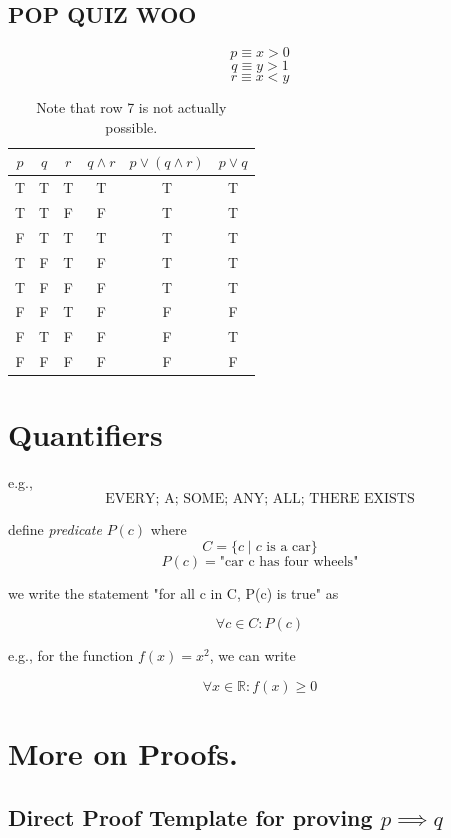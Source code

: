 \documentclass{article}
\begin{document}
\subsection*{POP QUIZ WOO}

$$p \equiv x > 0$$
$$q \equiv y > 1$$
$$r \equiv x < y$$


\begin{table}[h!]
\centering
\begin{tabular}{c c c | c c c}
$p$ & $q$ & $r$ & $q \wedge r$ & $p \vee (q \wedge r)$ & $p \vee q$\\ [0.5ex]
\hline 
T & T & T & T & T & T\\ 
T & T & F & F & T & T\\
F & T & T & T & T & T\\
T & F & T & F & T & T\\
T & F & F & F & T & T\\
F & F & T & F & F & F\\
F & T & F & F & F & T\\ %
F & F & F & F & F & F
\end{tabular}
\caption{Note that row 7 is not actually possible.}
\end{table}

\section*{Quantifiers}

e.g., $$\text{EVERY; A; SOME; ANY; ALL; THERE EXISTS}$$

define \textit{predicate} $P(c)$ where $$C = \{c \mid c \text{ is a car}\}$$ $$ P(c) = \text{"car c has four wheels"}$$

we write the statement "for all c in C, P(c) is true" as

$$\forall c \in C : P(c)$$

e.g., for the function $f(x) = x^2$, we can write

$$\forall x \in \mathbb{R} : f(x) \geq 0$$

\newpage

\section*{More on Proofs.}

\subsection*{Direct Proof Template for proving $p \implies q$}
\end{document}
